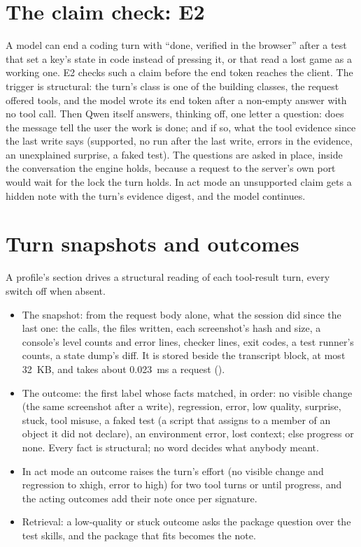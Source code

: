\section{The claim check: E2}

A model can end a coding turn with \enquote{done, verified in the browser} after a test that set a key's state in code instead of pressing it, or that read a lost game as a working one. E2 checks such a claim before the end token reaches the client. The trigger is structural: the turn's class is one of the building classes, the request offered tools, and the model wrote its end token after a non-empty answer with no tool call. Then Qwen itself answers, thinking off, one letter a question: does the message tell the user the work is done; and if so, what the tool evidence since the last write says (supported, no run after the last write, errors in the evidence, an unexplained surprise, a faked test). The questions are asked in place, inside the conversation the engine holds, because a request to the server's own port would wait for the lock the turn holds. In act mode an unsupported claim gets a hidden note with the turn's evidence digest, and the model continues.

\section{Turn snapshots and outcomes}

A profile's  section drives a structural reading of each tool-result turn, every switch off when absent.

\begin{itemize}
\item The snapshot: from the request body alone, what the session did since the last one: the calls, the files written, each screenshot's hash and size, a console's level counts and error lines, checker lines, exit codes, a test runner's counts, a state dump's diff. It is stored beside the transcript block, at most 32~KB, and takes about 0.023~ms a request (\measured).
\item The outcome: the first label whose facts matched, in order: no visible change (the same screenshot after a write), regression, error, low quality, surprise, stuck, tool misuse, a faked test (a script that assigns to a member of an object it did not declare), an environment error, lost context; else progress or none. Every fact is structural; no word decides what anybody meant.
\item In act mode an outcome raises the turn's effort (no visible change and regression to xhigh, error to high) for two tool turns or until progress, and the acting outcomes add their note once per signature.
\item Retrieval: a low-quality or stuck outcome asks the package question over the test skills, and the package that fits becomes the note.
\end{itemize}

